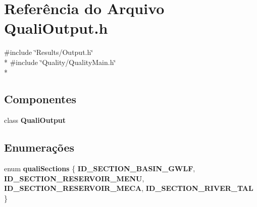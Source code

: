 \section{Referência do Arquivo Quali\+Output.\+h}
\label{_quali_output_8h}
{\ttfamily \#include \char`\"{}Results/\+Output.\+h\char`\"{}}\\*
{\ttfamily \#include \char`\"{}Quality/\+Quality\+Main.\+h\char`\"{}}\\*
\subsection*{Componentes}
\begin{DoxyCompactItemize}
\item 
class {\bf Quali\+Output}
\end{DoxyCompactItemize}
\subsection*{Enumerações}
\begin{DoxyCompactItemize}
\item 
enum {\bf quali\+Sections} \{ {\bf I\+D\+\_\+\+S\+E\+C\+T\+I\+O\+N\+\_\+\+B\+A\+S\+I\+N\+\_\+\+G\+W\+LF}, 
{\bf I\+D\+\_\+\+S\+E\+C\+T\+I\+O\+N\+\_\+\+R\+E\+S\+E\+R\+V\+O\+I\+R\+\_\+\+M\+E\+NU}, 
{\bf I\+D\+\_\+\+S\+E\+C\+T\+I\+O\+N\+\_\+\+R\+E\+S\+E\+R\+V\+O\+I\+R\+\_\+\+M\+E\+CA}, 
{\bf I\+D\+\_\+\+S\+E\+C\+T\+I\+O\+N\+\_\+\+R\+I\+V\+E\+R\+\_\+\+T\+AL}
 \}
\end{DoxyCompactItemize}
